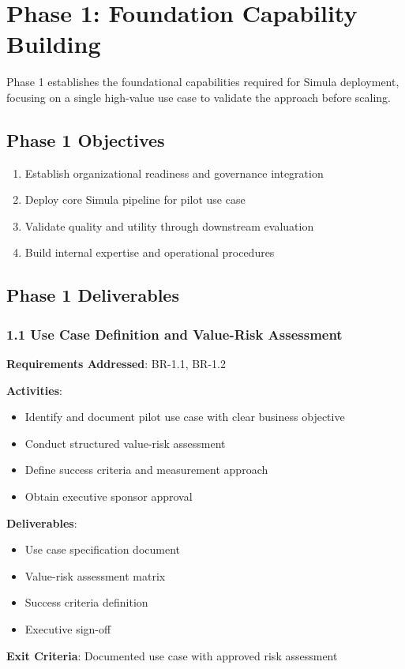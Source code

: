 \section{Phase 1: Foundation Capability Building}

Phase 1 establishes the foundational capabilities required for Simula deployment,
focusing on a single high-value use case to validate the approach before scaling.

\subsection{Phase 1 Objectives}

\begin{enumerate}
  \item Establish organizational readiness and governance integration
  \item Deploy core Simula pipeline for pilot use case
  \item Validate quality and utility through downstream evaluation
  \item Build internal expertise and operational procedures
\end{enumerate}

\subsection{Phase 1 Deliverables}

\subsubsection{1.1 Use Case Definition and Value-Risk Assessment}

\begin{tcolorbox}[colback=blue!5,colframe=blue!70,title=1.1 Use Case and Risk Assessment]
\textbf{Requirements Addressed}: BR-1.1, BR-1.2

\textbf{Activities}:
\begin{itemize}
  \item Identify and document pilot use case with clear business objective
  \item Conduct structured value-risk assessment
  \item Define success criteria and measurement approach
  \item Obtain executive sponsor approval
\end{itemize}

\textbf{Deliverables}:
\begin{itemize}
  \item Use case specification document
  \item Value-risk assessment matrix
  \item Success criteria definition
  \item Executive sign-off
\end{itemize}

\textbf{Exit Criteria}: Documented use case with approved risk assessment
\end{tcolorbox}

